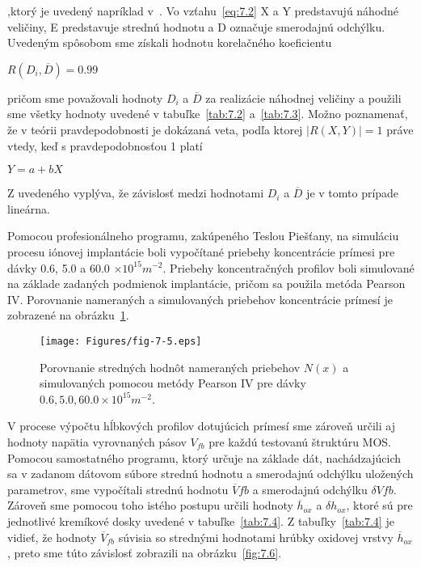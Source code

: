 ,ktorý je uvedený napríklad v~\cite{7.1}. Vo vzťahu~\ref{eq:7.2} X a Y
predstavujú náhodné veličiny, E predstavuje strednú hodnotu a D
označuje smerodajnú odchýlku. Uvedeným spôsobom sme získali hodnotu
korelačného koeficientu

\centerline{$R(D_{i}, \overline{D}) = 0.99$}

pričom sme považovali hodnoty $D_{i}$ a $\overline{D}$ za realizácie
náhodnej veličiny a použili sme všetky hodnoty uvedené v
tabuľke~\ref{tab:7.2} a~\ref{tab:7.3}. Možno poznamenať, že v teórii
pravdepodobnosti je dokázaná veta, podľa ktorej $\rvert R(X,Y)\rvert =
1$ práve vtedy, keď s pravdepodobnosťou 1 platí

\centerline{$Y = a + b X$}

Z uvedeného vyplýva, že závislosť medzi hodnotami $D_{i}$ a $\overline
D$ je v tomto prípade lineárna.

Pomocou profesionálneho programu, zakúpeného Teslou Piešťany, na
simuláciu procesu iónovej implantácie boli vypočítané priebehy
koncentrácie prímesi pre dávky 0.6, 5.0 a 60.0 $\times10^{15}m^{-2}$.
Priebehy koncentračných profilov boli simulované na základe zadaných
podmienok implantácie, pričom sa použila metóda Pearson IV\@.
Porovnanie nameraných a simulovaných priebehov koncentrácie prímesí je
zobrazené na obrázku~\ref{fig:7.5}.

\begin{figure}[h!]\centering
  \begin{minipage}[c]{\myfiguresize}
    \begin{center}
      \texttt{[image: Figures/fig-7-5.eps]}
    \end{center}
    \caption[Porovnanie stredných hodnôt nameraných priebehov $N(x)$ a
      simulovaných pomocou metódy Pearson IV]{Porovnanie stredných
      hodnôt nameraných priebehov $N(x)$ a simulovaných pomocou metódy
      Pearson IV pre dávky $0.6, 5.0, 60.0 \times 10^{15}
      m^{-2}$.}\label{fig:7.5}
  \end{minipage}
\end{figure}

V procese výpočtu hĺbkových profilov dotujúcich prímesí sme zároveň
určili aj hodnoty napätia vyrovnaných pásov $V_{fb}$ pre každú
testovanú štruktúru MOS\@. Pomocou samostatného programu, ktorý určuje
na základe dát, nachádzajúcich sa v zadanom dátovom súbore strednú
hodnotu a smerodajnú odchýlku uložených parametrov, sme vypočítali
strednú hodnotu $\overline V{fb}$ a smerodajnú odchýlku $\delta
V{fb}$. Zároveň sme pomocou toho istého postupu určili hodnoty
$\overline h_{ox}$ a $\delta h_{ox}$, ktoré sú pre jednotlivé
kremíkové dosky uvedené v tabuľke~\ref{tab:7.4}. Z
tabuľky~\ref{tab:7.4} je vidieť, že hodnoty $\overline V_{fb}$ súvisia
so strednými hodnotami hrúbky oxidovej vrstvy $\overline h_{ox}$,
preto sme túto závislosť zobrazili na obrázku~\ref{fig:7.6}.

